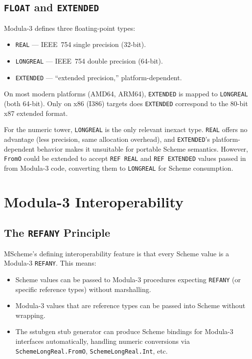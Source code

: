 \documentclass[12pt]{report}
\begin{document}
\section{{\tt FLOAT} and {\tt EXTENDED}}
\label{sec:float-extended}

Modula-3 defines three floating-point types:
\begin{itemize}
\item {\tt REAL} --- IEEE~754 single precision (32-bit).
\item {\tt LONGREAL} --- IEEE~754 double precision (64-bit).
\item {\tt EXTENDED} --- ``extended precision,'' platform-dependent.
\end{itemize}

On most modern platforms (AMD64, ARM64), {\tt EXTENDED} is mapped
to {\tt LONGREAL} (both 64-bit).  Only on x86 (I386) targets does
{\tt EXTENDED} correspond to the 80-bit x87 extended format.

For the numeric tower, {\tt LONGREAL} is the only relevant inexact
type.  {\tt REAL} offers no advantage (less precision, same allocation
overhead), and {\tt EXTENDED}'s platform-dependent behavior makes it
unsuitable for portable Scheme semantics.  However, {\tt FromO} could
be extended to accept {\tt REF REAL} and {\tt REF EXTENDED} values
passed in from Modula-3 code, converting them to {\tt LONGREAL} for
Scheme consumption.

\chapter{Modula-3 Interoperability}
\label{ch:m3interop}

\section{The {\tt REFANY} Principle}

MScheme's defining interoperability feature is that every Scheme value
is a Modula-3 {\tt REFANY}.  This means:

\begin{itemize}
\item Scheme values can be passed to Modula-3 procedures expecting
  {\tt REFANY} (or specific reference types) without marshalling.
\item Modula-3 values that are reference types can be passed into
  Scheme without wrapping.
\item The sstubgen stub generator can produce Scheme bindings for
  Modula-3 interfaces automatically, handling numeric conversions
  via {\tt SchemeLongReal.FromO}, {\tt SchemeLongReal.Int}, etc.
\end{itemize}
\end{document}
